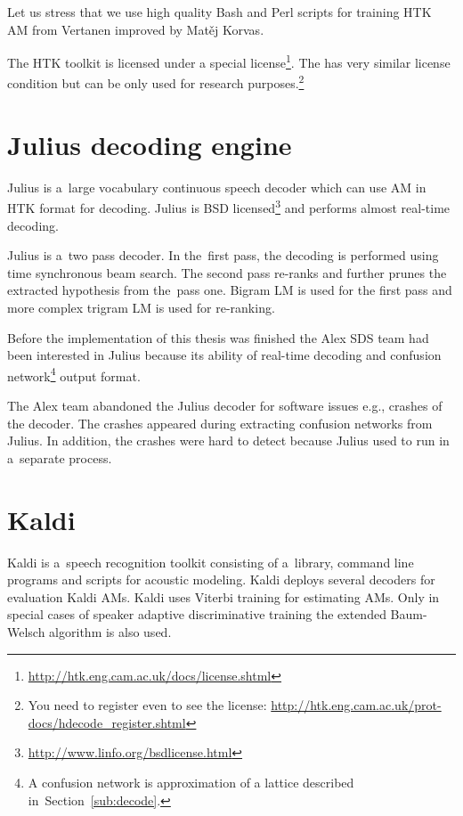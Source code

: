 Let us stress that we use high quality Bash and Perl scripts for training \ac{HTK} \ac{AM} from Vertanen improved by Matěj Korvas.\cite{vertanen_baseline_2006}\cite{korvas_2014}

The \ac{HTK} toolkit is licensed under a special license\footnote{\url{http://htk.eng.cam.ac.uk/docs/license.shtml}}.
The  has very similar license condition but can be only used for research purposes.\footnote{You need to register even to see the license: \url{http://htk.eng.cam.ac.uk/prot-docs/hdecode_register.shtml}}

\section{Julius decoding engine}
\label{sec:back_julius}

Julius is a~large vocabulary continuous speech decoder which can use \ac{AM} in \ac{HTK} format for decoding.\cite{lee2009julius}
Julius is BSD licensed\footnote{\url{http://www.linfo.org/bsdlicense.html}} and performs almost real-time decoding.

Julius is a~two pass decoder. 
In the~first pass, the decoding is performed using time synchronous beam search.
The second pass re-ranks and further prunes the extracted hypothesis from the~pass one.
Bigram \ac{LM} is used for the first pass and more complex trigram \ac{LM} is used for re-ranking.

Before the implementation of this thesis was finished the Alex \ac{SDS} team had been interested in Julius because its ability of real-time decoding and confusion network\footnote{A confusion network is approximation of a lattice described in~Section~\ref{sub:decode}.} output format.

The Alex team abandoned the Julius decoder for software issues e.g., crashes of the decoder. 
The crashes appeared during extracting confusion networks from Julius. 
In addition, the crashes were hard to detect because Julius used to run in a~separate process.

\section{Kaldi}
\label{sec:back_kaldi}

Kaldi is a~speech recognition toolkit consisting of a~library, command line programs and scripts for acoustic modeling.
Kaldi deploys several decoders for evaluation Kaldi \acp{AM}.
Kaldi uses Viterbi training for estimating \acp{AM}. 
Only in special cases of speaker adaptive discriminative training the extended Baum-Welsch algorithm is also used\cite{povey2011kaldi}.

